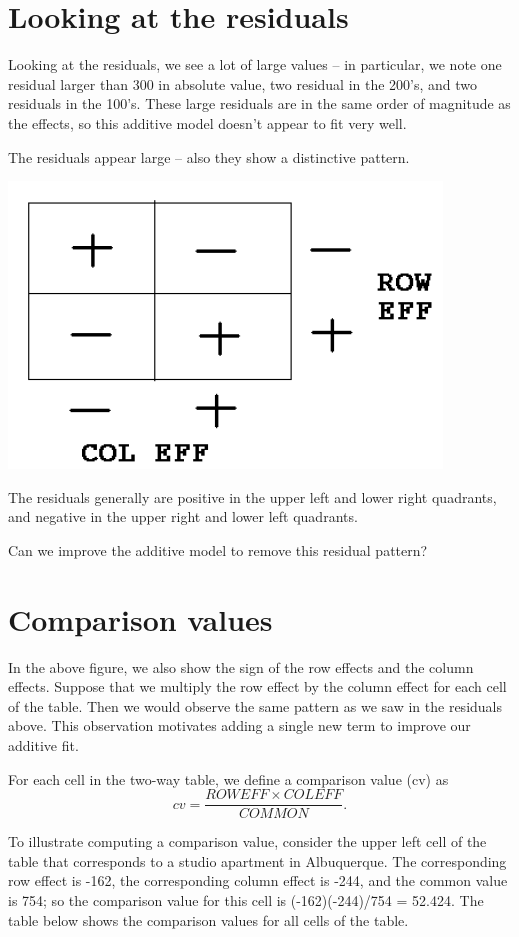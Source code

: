 \documentclass[
]{book}
\begin{document}
\hypertarget{looking-at-the-residuals-2}{%
\section{Looking at the residuals}\label{looking-at-the-residuals-2}}

Looking at the residuals, we see a lot of large values -- in particular, we note one residual larger than 300 in absolute value, two residual in the 200's, and two residuals in the 100's. These large residuals are in the same order of magnitude as the effects, so this additive model doesn't appear to fit very well.

The residuals appear large -- also they show a distinctive pattern.

\includegraphics[width=0.4\linewidth]{figures/medpolish/newplot2}

The residuals generally are positive in the upper left and lower right quadrants, and negative in the upper right and lower left quadrants.

Can we improve the additive model to remove this residual pattern?

\hypertarget{comparison-values}{%
\section{Comparison values}\label{comparison-values}}

In the above figure, we also show the sign of the row effects and the column effects. Suppose that we multiply the row effect by the column effect for each cell of the table. Then we would observe the same pattern as we saw in the residuals above. This observation motivates adding a single new term to improve our additive fit.

For each cell in the two-way table, we define a comparison value (cv) as
\[
cv = \frac{ROWEFF \times COLEFF}{COMMON}.
\]

To illustrate computing a comparison value, consider the upper left cell of the table that corresponds to a studio apartment in Albuquerque. The corresponding row effect is -162, the corresponding column effect is -244, and the common value is 754; so the comparison value for this cell is (-162)(-244)/754 = 52.424. The table below shows the comparison values for all cells of the table.
\end{document}

